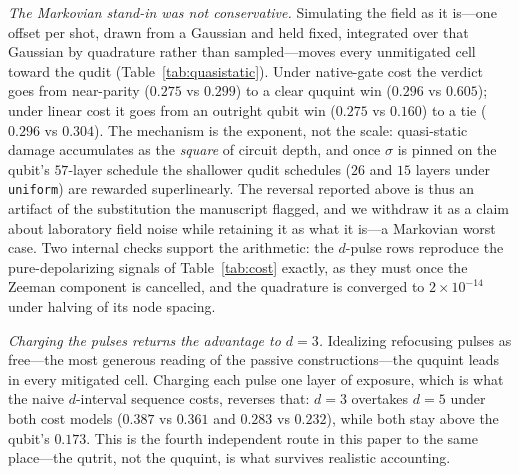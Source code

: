 \documentclass[aps,pra,reprint,superscriptaddress,nofootinbib,floatfix]{revtex4-2}
\begin{document}
\emph{The Markovian stand-in was not conservative.} Simulating the
field as it is---one offset per shot, drawn from a Gaussian and held
fixed, integrated over that Gaussian by quadrature rather than
sampled---moves every unmitigated cell toward the qudit
(Table~\ref{tab:quasistatic}). Under native-gate cost the verdict goes
from near-parity ($0.275$ vs $0.299$) to a clear ququint win ($0.296$
vs $0.605$); under linear cost it goes from an outright qubit win
($0.275$ vs $0.160$) to a tie ($0.296$ vs $0.304$). The mechanism is
the exponent, not the scale: quasi-static damage accumulates as the
\emph{square} of circuit depth, and once $\sigma$ is pinned on the
qubit's $57$-layer schedule the shallower qudit schedules ($26$ and
$15$ layers under \texttt{uniform}) are rewarded superlinearly. The
reversal reported above is thus an artifact of the substitution the
manuscript flagged, and we withdraw it as a claim about laboratory
field noise while retaining it as what it is---a Markovian worst case.
Two internal checks support the arithmetic: the $d$-pulse rows
reproduce the pure-depolarizing signals of Table~\ref{tab:cost}
exactly, as they must once the Zeeman component is cancelled, and the
quadrature is converged to $2\times10^{-14}$ under halving of its node
spacing.

\emph{Charging the pulses returns the advantage to $d=3$.} Idealizing
refocusing pulses as free---the most generous reading of the passive
constructions---the ququint leads in every mitigated cell. Charging
each pulse one layer of exposure, which is what the naive
$d$-interval sequence costs, reverses that: $d=3$ overtakes $d=5$
under both cost models ($0.387$ vs $0.361$ and $0.283$ vs $0.232$),
while both stay above the qubit's $0.173$. This is the fourth
independent route in this paper to the same place---the qutrit, not
the ququint, is what survives realistic accounting.
\end{document}
